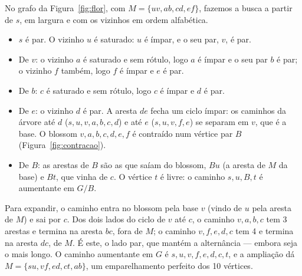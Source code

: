 \begin{exemplo}\label{ex:blossom}
No grafo da Figura~\ref{fig:flor}, com $M=\{uv,ab,cd,ef\}$, fazemos a busca a partir de $s$, em largura e com os vizinhos em ordem alfabética.
\begin{itemize}
  \item $s$ é par. O vizinho $u$ é saturado: $u$ é ímpar, e o seu par, $v$, é par.
  \item De $v$: o vizinho $a$ é saturado e sem rótulo, logo $a$ é ímpar e o seu par $b$ é par; o vizinho $f$ também, logo $f$ é ímpar e $e$ é par.
  \item De $b$: $c$ é saturado e sem rótulo, logo $c$ é ímpar e $d$ é par.
  \item De $e$: o vizinho $d$ é par. A aresta $de$ fecha um ciclo ímpar: os caminhos da árvore até $d$ ($s,u,v,a,b,c,d$) e até $e$ ($s,u,v,f,e$) se separam em $v$, que é a base. O blossom $v,a,b,c,d,e,f$ é contraído num vértice par $B$ (Figura~\ref{fig:contracao}).
  \item De $B$: as arestas de $B$ são as que saíam do blossom, $Bu$ (a aresta de $M$ da base) e $Bt$, que vinha de $c$. O vértice $t$ é livre: o caminho $s,u,B,t$ é aumentante em $G/B$.
\end{itemize}
Para expandir, o caminho entra no blossom pela base $v$ (vindo de $u$ pela aresta de $M$) e sai por $c$. Dos dois lados do ciclo de $v$ até $c$, o caminho $v,a,b,c$ tem 3 arestas e termina na aresta $bc$, fora de $M$; o caminho $v,f,e,d,c$ tem 4 e termina na aresta $dc$, de $M$. É este, o lado par, que mantém a alternância --- embora seja o mais longo. O caminho aumentante em $G$ é $s,u,v,f,e,d,c,t$, e a ampliação dá $M=\{su,vf,ed,ct,ab\}$, um emparelhamento perfeito dos 10 vértices.
\begin{figura}
\end{figura}
\end{exemplo}
